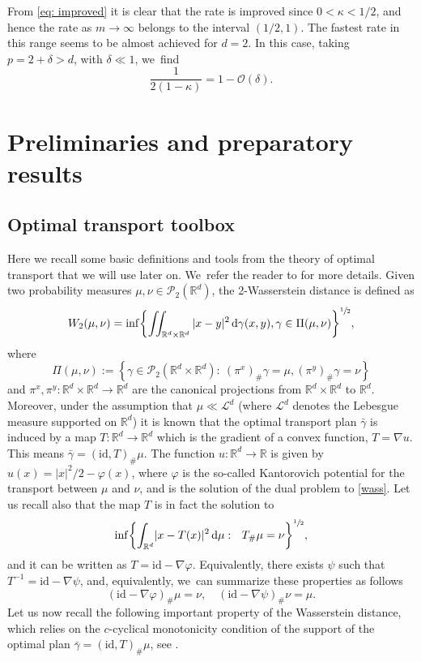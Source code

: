 \documentclass[10pt]{amsart}
\newcommand{\curlyL}{\mathcal{L}}
\newcommand{\curlyP}{\mathcal{P}}
\newcommand{\dx}[1]{\mathop{}\!\mathrm{d} #1}
\newcommand{\R}{\mathbb{R}}
\theoremstyle{plain}
\theoremstyle{remark}
\begin{document}
From \eqref{eq: improved} it is clear that the rate is improved since $0<{\kappa}<1/2$, and hence the rate as $m\to\infty$ belongs to the interval $(1/2, 1)$.
The fastest rate in this range seems to be almost achieved for $d=2$. In this case,
taking $p=2+\delta>d$, with $\delta\ll1$, we~find
\begin{equation*}
\frac{1}{2(1-\kappa)}= 1 - \mathcal{O}(\delta).
\end{equation*}

\section{Preliminaries and preparatory results}\label{sec: prelim}

\subsection{Optimal transport toolbox}

Here we recall some basic definitions and tools from the theory of optimal transport that we will use later on. We~refer the reader to \cite{OTAM,villaniOT} for more details.
Given two probability measures $\mu, \nu \in \curlyP_2(\R^d)$, the 2-Wasserstein distance is defined as
\begin{equation}\label{wass}
W_2(\mu, \nu) = \inf \biggl\{\iint_{\R^d\times\R^d} |x-y|^2 \dx \gamma(x,y), \gamma \in \Pi(\mu,\nu)\biggr\}^{\sfrac 12},
\end{equation}
where
\[
\Pi(\mu,\nu):=\left\{\gamma {\in\curlyP_2(\R^d\times\R^d)}:\ (\pi^x)_\#\gamma = \mu, (\pi^y)_\#\gamma = \nu \right\}
\]
and ${\pi^x, \pi^y:\R^d\times\R^d\to\R^d}$ are the canonical projections from $\R^d\times\R^d$ to $\R^d$. Moreover, under the assumption that $\mu\ll \curlyL^d$ (where $\curlyL^d$ denotes the Lebesgue measure {supported} on $\R^d$) it is known that the optimal transport plan $\bar\gamma$ is induced by a map $T:\R^d\to\R^d$ which is the gradient of a convex function, $T=\nabla u$. This means $\bar\gamma= (\mathrm{id}, T)_\#\mu$. The function $u:\R^d \to \R$ is given by $u(x)=|x|^2/2 -\varphi(x)$, where $\varphi$ is the so-called Kantorovich potential for the transport between $\mu$ and $\nu$, and is the solution of the dual problem to \eqref{wass}.
Let us recall also that the map $T$ is in fact the solution to
\begin{equation*}
\inf \biggl\{{\int_{\R^d}} |x-T(x)|^2 \dx \mu:\ \ T_\#\mu = \nu\biggr\}^{\sfrac 12},
\end{equation*}
and it can be written as $T=\mathrm{id} - \nabla \varphi$.
Equivalently, there exists $\psi$ such that $T^{-1}=\mathrm{id}-\nabla \psi$, and, equivalently, we~can summarize these properties as follows
\begin{equation*}
(\mathrm{id} - \nabla \varphi)_\#\mu = \nu, \quad (\mathrm{id} - \nabla \psi)_\#\nu = \mu.
\end{equation*}
Let us now recall the following important property of the Wasserstein distance, which relies on the $c$-cyclical monotonicity condition {of the support of the optimal plan $\bar\gamma = (\mathrm{id}, T)_\#\mu$}, see \cite{BJR2007}.
\end{document}
